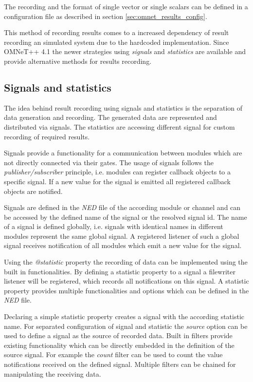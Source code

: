 The recording and the format of single vector or single scalars can be defined in a configuration file as described in section \ref{sec:omnet_results_config}.

This method of recording results comes to a increased dependency of result recording an simulated system due to the hardcoded implementation.
Since OMNeT++ 4.1 the newer strategies using \emph{signals} and \emph{statistics} are available and provide alternative methods for results recording.

\subsection{Signals and statistics}
\label{sec:omnet_results_signals}
The idea behind result recording using signals and statistics is the separation of data generation and recording.
The generated data are represented and distributed via signals.
The statistics are accessing different signal for custom recording of required results. \cite[section 12.1.1]{omnet_manual}

Signals provide a functionality for a communication between modules which are not directly connected via their gates.
The usage of signals follows the \emph{publisher/subscriber} principle, i.e. modules can register callback objects to a specific signal.
If a new value for the signal is emitted all registered callback objects are notified.

Signals are defined in the \emph{NED} file of the according module or channel and can be accessed by the defined name of the signal or the resolved signal id.
The name of a signal is defined globally, i.e. signals with identical names in different modules represent the same global signal.
A registered listener of such a global signal receives notification of all modules which emit a new value for the signal. \cite[section 4.14]{omnet_manual}

Using the \emph{@statistic} property the recording of data can be implemented using the built in functionalities.
By defining a statistic property to a signal a filewriter listener will be registered, which records all notifications on this signal.
A statistic property provides multiple functionalities and options which can be defined in the \emph{NED} file.

Declaring a simple statistic property creates a signal with the according statistic name.
For separated configuration of signal and statistic the \emph{source} option can be used to define a signal as the source of recorded data.
Built in filters provide existing functionality which can be directly embedded in the definition of the source signal.
For example the \emph{count} filter can be used to count the value notifications received on the defined signal.
Multiple filters can be chained for manipulating the receiving data.

